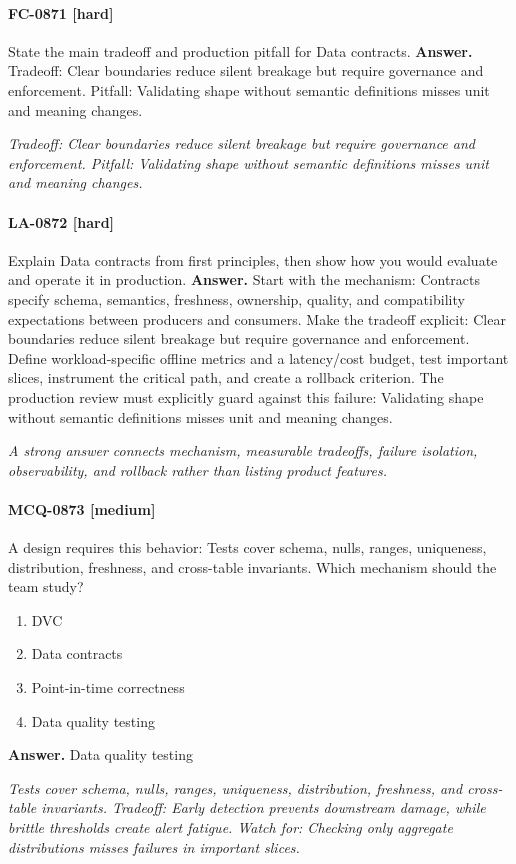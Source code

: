 \paragraph{FC-0871 [hard]} State the main tradeoff and production pitfall for Data contracts.
\noindent\textbf{Answer.} Tradeoff: Clear boundaries reduce silent breakage but require governance and enforcement. Pitfall: Validating shape without semantic definitions misses unit and meaning changes.
\par\textit{Tradeoff: Clear boundaries reduce silent breakage but require governance and enforcement. Pitfall: Validating shape without semantic definitions misses unit and meaning changes.}
\paragraph{LA-0872 [hard]} Explain Data contracts from first principles, then show how you would evaluate and operate it in production.
\noindent\textbf{Answer.} Start with the mechanism: Contracts specify schema, semantics, freshness, ownership, quality, and compatibility expectations between producers and consumers. Make the tradeoff explicit: Clear boundaries reduce silent breakage but require governance and enforcement. Define workload-specific offline metrics and a latency/cost budget, test important slices, instrument the critical path, and create a rollback criterion. The production review must explicitly guard against this failure: Validating shape without semantic definitions misses unit and meaning changes.
\par\textit{A strong answer connects mechanism, measurable tradeoffs, failure isolation, observability, and rollback rather than listing product features.}
\paragraph{MCQ-0873 [medium]} A design requires this behavior: Tests cover schema, nulls, ranges, uniqueness, distribution, freshness, and cross-table invariants. Which mechanism should the team study?
\begin{enumerate}[label=\Alph*.]
\item DVC
\item Data contracts
\item Point-in-time correctness
\item Data quality testing
\end{enumerate}
\noindent\textbf{Answer.} Data quality testing
\par\textit{Tests cover schema, nulls, ranges, uniqueness, distribution, freshness, and cross-table invariants. Tradeoff: Early detection prevents downstream damage, while brittle thresholds create alert fatigue. Watch for: Checking only aggregate distributions misses failures in important slices.}
